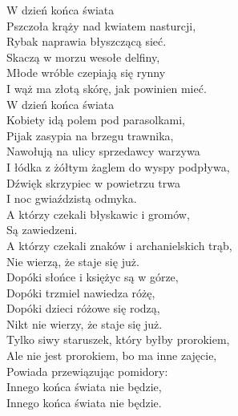 
W dzień końca świata  \\
Pszczoła krąży nad kwiatem nasturcji,  \\
Rybak naprawia błyszczącą sieć.  \\
Skaczą w morzu wesołe delfiny,  \\
Młode wróble czepiają się rynny  \\
I wąż ma złotą skórę, jak powinien mieć. \\
\hops
W dzień końca świata  \\
Kobiety idą polem pod parasolkami,  \\
Pijak zasypia na brzegu trawnika,  \\
Nawołują na ulicy sprzedawcy warzywa  \\
I łódka z żółtym żaglem do wyspy podpływa,  \\
Dźwięk skrzypiec w powietrzu trwa  \\
I noc gwiaździstą odmyka. \\
\hops
A którzy czekali błyskawic i gromów,  \\
Są zawiedzeni.  \\
A którzy czekali znaków i archanielskich trąb,  \\
Nie wierzą, że staje się już.  \\
Dopóki słońce i księżyc są w górze,  \\
Dopóki trzmiel nawiedza różę,  \\
Dopóki dzieci różowe się rodzą,  \\
Nikt nie wierzy, że staje się już. \\
\hops
Tylko siwy staruszek, który byłby prorokiem,  \\
Ale nie jest prorokiem, bo ma inne zajęcie,  \\
Powiada przewiązując pomidory:  \\
Innego końca świata nie będzie,  \\
Innego końca świata nie będzie. 
